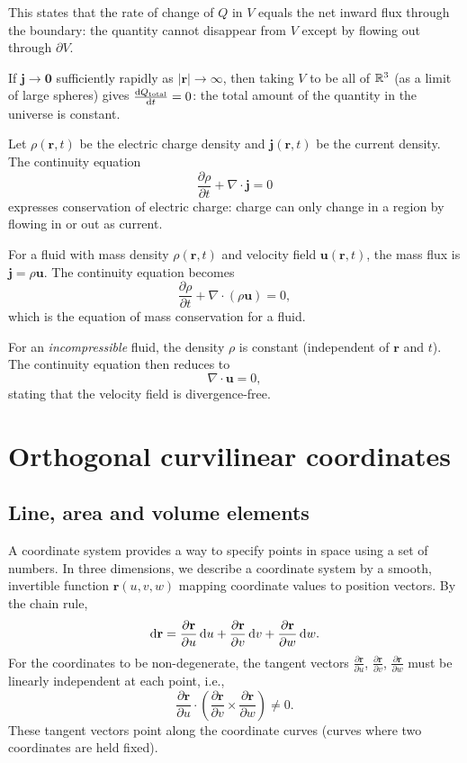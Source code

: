 \documentclass[a4paper]{article}
\begin{document}
This states that the rate of change of $Q$ in $V$ equals the net inward flux through the boundary: the quantity cannot disappear from $V$ except by flowing out through $\partial V$.

\begin{rmk}
  If $\mathbf{j} \to \mathbf{0}$ sufficiently rapidly as $|\mathbf{r}| \to \infty$, then taking $V$ to be all of $\mathbb{R}^3$ (as a limit of large spheres) gives $\frac{\mathrm{d} Q_{\text{total}}}{\mathrm{d} t} = 0$: the total amount of the quantity in the universe is constant.
\end{rmk}
\begin{eg}
  Let $\rho(\mathbf{r}, t)$ be the electric charge density and $\mathbf{j}(\mathbf{r}, t)$ be the current density. The continuity equation
  \[
    \frac{\partial \rho}{\partial t} + \nabla\cdot \mathbf{j} = 0
  \]
  expresses conservation of electric charge: charge can only change in a region by flowing in or out as current.
\end{eg}

\begin{eg}
  For a fluid with mass density $\rho(\mathbf{r}, t)$ and velocity field $\mathbf{u}(\mathbf{r}, t)$, the mass flux is $\mathbf{j} = \rho \mathbf{u}$. The continuity equation becomes
  \[
    \frac{\partial \rho}{\partial t} + \nabla\cdot (\rho \mathbf{u}) = 0,
  \]
  which is the equation of mass conservation for a fluid.

  For an \emph{incompressible} fluid, the density $\rho$ is constant (independent of $\mathbf{r}$ and $t$). The continuity equation then reduces to
  \[
    \nabla\cdot \mathbf{u} = 0,
  \]
  stating that the velocity field is divergence-free.
\end{eg}

\section{Orthogonal curvilinear coordinates}
\subsection{Line, area and volume elements}
A coordinate system provides a way to specify points in space using a set of numbers. In three dimensions, we describe a coordinate system by a smooth, invertible function $\mathbf{r}(u, v, w)$ mapping coordinate values to position vectors. By the chain rule,
\[
  \mathrm{d} \mathbf{r} = \frac{\partial \mathbf{r}}{\partial u}\,\mathrm{d} u + \frac{\partial \mathbf{r}}{\partial v}\,\mathrm{d} v + \frac{\partial \mathbf{r}}{\partial w}\,\mathrm{d} w.
\]
For the coordinates to be non-degenerate, the tangent vectors $\frac{\partial \mathbf{r}}{\partial u}$, $\frac{\partial \mathbf{r}}{\partial v}$, $\frac{\partial \mathbf{r}}{\partial w}$ must be linearly independent at each point, i.e.,
\[
  \frac{\partial \mathbf{r}}{\partial u}\cdot \left(\frac{\partial \mathbf{r}}{\partial v}\times \frac{\partial \mathbf{r}}{\partial w}\right) \neq 0.
\]
These tangent vectors point along the coordinate curves (curves where two coordinates are held fixed).
\end{document}

